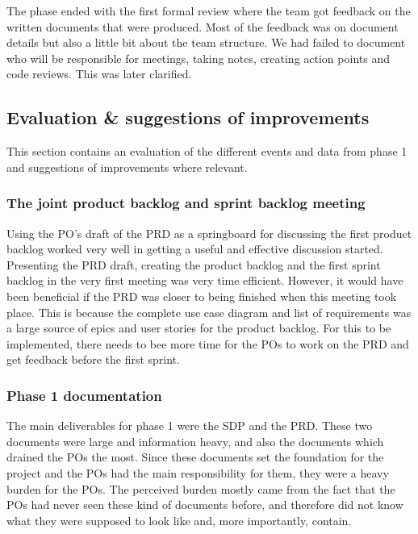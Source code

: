 \documentclass{article}
\begin{document}
The phase ended with the first formal review where the team got feedback on the written documents that were produced. Most of the feedback was on document details but also a little bit about the team structure. We had failed to document who will be responsible for meetings, taking notes, creating action points and code reviews. This was later clarified.

\subsection{Evaluation \& suggestions of improvements }
This section contains an evaluation of the different events and data from phase 1 and suggestions of improvements where relevant. 
\subsubsection{The joint product backlog and sprint backlog meeting}
Using the PO's draft of the PRD as a springboard for discussing the first product backlog worked very well in getting a useful and effective discussion started. Presenting the PRD draft, creating the product backlog and the first sprint backlog in the very first meeting was very time efficient. However, it would have been beneficial if the PRD was closer to being finished when this meeting took place. This is because the complete use case diagram and list of requirements was a large source of epics and user stories for the product backlog. For this to be implemented, there needs to bee more time for the POs to work on the PRD and get feedback before the first sprint.

\subsubsection{Phase 1 documentation}\label{POBurden}
The main deliverables for phase 1 were the SDP and the PRD. These two documents were large and information heavy, and also the documents which drained the POs the most. Since these documents set the foundation for the project and the POs had the main responsibility for them, they were a heavy burden for the POs. The perceived burden mostly came from the fact that the POs had never seen these kind of documents before, and therefore did not know what they were supposed to look like and, more importantly, contain. 
\end{document}
